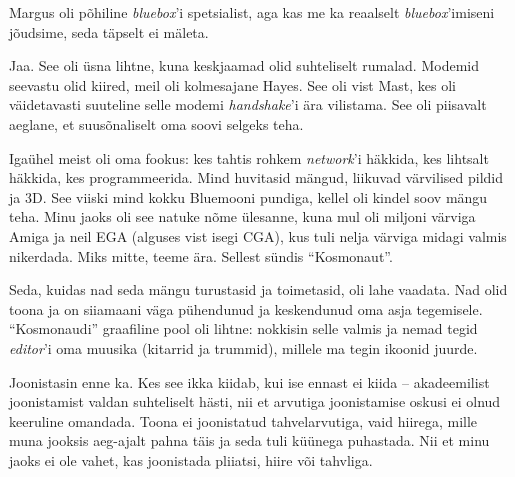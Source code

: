 Margus 
oli põhiline \emph{bluebox}'i spetsialist, aga kas me ka reaalselt 
\emph{bluebox}'imiseni jõudsime, seda täpselt ei mäleta.


Jaa. See oli üsna lihtne, kuna 
keskjaamad olid suhteliselt rumalad. Modemid seevastu olid kiired, meil oli 
kolmesajane Hayes. See oli vist
Mast, kes oli väidetavasti suuteline selle modemi 
\emph{handshake}'i ära vilistama. See oli 
piisavalt aeglane, et
suusõnaliselt oma soovi selgeks teha.

Igaühel meist oli oma fookus: kes tahtis rohkem 
\emph{network}'i häkkida, kes lihtsalt häkkida, kes 
programmeerida. Mind huvitasid mängud, liikuvad värvilised 
pildid ja 3D. See viiski mind kokku
Bluemooni pundiga, kellel oli kindel soov mängu 
teha. Minu jaoks oli see natuke nõme ülesanne, kuna 
mul oli miljoni värviga Amiga ja neil 
EGA (alguses vist isegi CGA), kus tuli nelja värviga 
midagi valmis nikerdada. Miks mitte, teeme ära. Sellest sündis 
\enquote{Kosmonaut}. 

Seda, kuidas nad seda mängu turustasid ja toimetasid, oli lahe vaadata. Nad 
olid toona ja on siiamaani väga pühendunud ja keskendunud oma asja 
tegemisele. \enquote{Kosmonaudi} graafiline pool oli lihtne: nokkisin selle valmis ja 
nemad tegid 
\emph{editor}'i oma muusika (kitarrid ja trummid), millele ma tegin ikoonid 
juurde.


Joonistasin enne ka. Kes see ikka kiidab, kui ise ennast ei kiida -- 
akadeemilist joonistamist valdan suhteliselt hästi, nii et arvutiga 
joonistamise oskusi 
ei olnud keeruline omandada. Toona ei joonistatud tahvelarvutiga,
vaid hiirega, mille muna jooksis aeg-ajalt pahna täis ja seda tuli
küünega puhastada. Nii et minu jaoks ei ole vahet, kas joonistada
pliiatsi, hiire või tahvliga.


